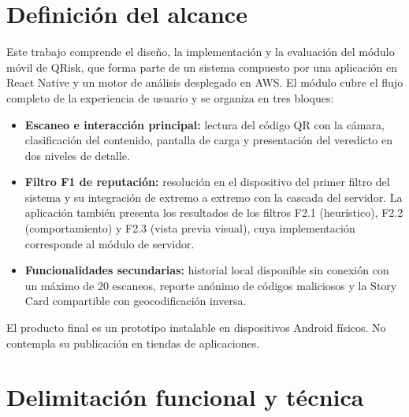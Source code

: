 \label{chap:alcance}
\section{Definición del alcance}

Este trabajo comprende el diseño, la implementación y la evaluación del módulo móvil de QRisk, que forma parte de un sistema compuesto por una aplicación en React Native y un motor de análisis desplegado en AWS. El módulo cubre el flujo completo de la experiencia de usuario y se organiza en tres bloques:

\begin{itemize}
	\item \textbf{Escaneo e interacción principal:} lectura del código QR con la cámara, clasificación del contenido, pantalla de carga y presentación del veredicto en dos niveles de detalle.
	\item \textbf{Filtro F1 de reputación:} resolución en el dispositivo del primer filtro del sistema y su integración de extremo a extremo con la cascada del servidor. La aplicación también presenta los resultados de los filtros F2.1 (heurístico), F2.2 (comportamiento) y F2.3 (vista previa visual), cuya implementación corresponde al módulo de servidor.
	\item \textbf{Funcionalidades secundarias:} historial local disponible sin conexión con un máximo de 20 escaneos, reporte anónimo de códigos maliciosos y la Story Card compartible con geocodificación inversa.
\end{itemize}

El producto final es un prototipo instalable en dispositivos Android físicos. No contempla su publicación en tiendas de aplicaciones.

\section{Delimitación funcional y técnica}

